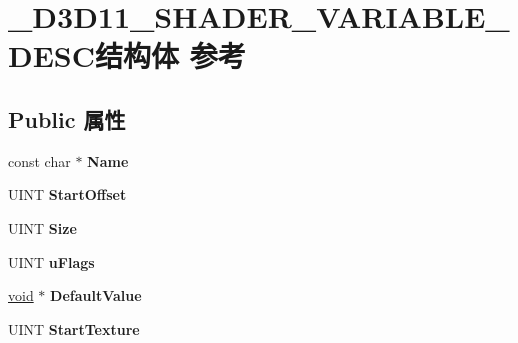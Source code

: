 \hypertarget{struct___d3_d11___s_h_a_d_e_r___v_a_r_i_a_b_l_e___d_e_s_c}{}\section{\+\_\+\+D3\+D11\+\_\+\+S\+H\+A\+D\+E\+R\+\_\+\+V\+A\+R\+I\+A\+B\+L\+E\+\_\+\+D\+E\+S\+C结构体 参考}
\label{struct___d3_d11___s_h_a_d_e_r___v_a_r_i_a_b_l_e___d_e_s_c}
\subsection*{Public 属性}
\begin{DoxyCompactItemize}
\item 
\mbox{\label{struct___d3_d11___s_h_a_d_e_r___v_a_r_i_a_b_l_e___d_e_s_c_a6fb239950c786b459263abbf36a5e26f}} 
const char $\ast$ {\bfseries Name}
\item 
\mbox{\label{struct___d3_d11___s_h_a_d_e_r___v_a_r_i_a_b_l_e___d_e_s_c_aa790355c239e87a97aa4a2c805ae7ad7}} 
U\+I\+NT {\bfseries Start\+Offset}
\item 
\mbox{\label{struct___d3_d11___s_h_a_d_e_r___v_a_r_i_a_b_l_e___d_e_s_c_a038c38a81822555b542942c427e5818b}} 
U\+I\+NT {\bfseries Size}
\item 
\mbox{\label{struct___d3_d11___s_h_a_d_e_r___v_a_r_i_a_b_l_e___d_e_s_c_a48ad8c304e0deb52d7f18062fb7bb07e}} 
U\+I\+NT {\bfseries u\+Flags}
\item 
\mbox{\label{struct___d3_d11___s_h_a_d_e_r___v_a_r_i_a_b_l_e___d_e_s_c_a30a177afa9a77b50f44c032176e83081}} 
\hyperlink{interfacevoid}{void} $\ast$ {\bfseries Default\+Value}
\item 
\mbox{\label{struct___d3_d11___s_h_a_d_e_r___v_a_r_i_a_b_l_e___d_e_s_c_a0a14d878e17ccd7a9f0d59b2d4fe1349}} 
U\+I\+NT {\bfseries Start\+Texture}

\end{DoxyCompactItemize}

